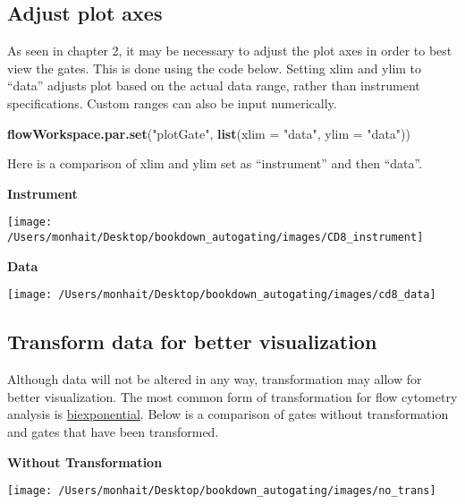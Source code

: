 \documentclass[]{book}
\newenvironment{Shaded}{\begin{snugshade}}{\end{snugshade}}
\newcommand{\DataTypeTok}[1]{\textcolor[rgb]{0.13,0.29,0.53}{#1}}
\newcommand{\KeywordTok}[1]{\textcolor[rgb]{0.13,0.29,0.53}{\textbf{#1}}}
\newcommand{\NormalTok}[1]{#1}
\newcommand{\StringTok}[1]{\textcolor[rgb]{0.31,0.60,0.02}{#1}}
\begin{document}
\hypertarget{adjust-plot-axes}{%
\subsection{Adjust plot axes}\label{adjust-plot-axes}}

As seen in chapter 2, it may be necessary to adjust the plot axes in order to best view the gates. This is done using the code below. Setting xlim and ylim to ``data'' adjusts plot based on the actual data range, rather than instrument specifications. Custom ranges can also be input numerically.

\begin{Shaded}
\begin{Highlighting}[]
\KeywordTok{flowWorkspace.par.set}\NormalTok{(}\StringTok{"plotGate"}\NormalTok{, }\KeywordTok{list}\NormalTok{(}\DataTypeTok{xlim =} \StringTok{"data"}\NormalTok{,}
                                       \DataTypeTok{ylim =} \StringTok{"data"}\NormalTok{))}
\end{Highlighting}
\end{Shaded}

Here is a comparison of xlim and ylim set as ``instrument'' and then ``data''.

\textbf{Instrument}

\texttt{[image: /Users/monhait/Desktop/bookdown\_autogating/images/CD8\_instrument]}

\textbf{Data}

\texttt{[image: /Users/monhait/Desktop/bookdown\_autogating/images/cd8\_data]}

\hypertarget{transform-data-for-better-visualization}{%
\subsection{Transform data for better visualization}\label{transform-data-for-better-visualization}}

Although data will not be altered in any way, transformation may allow for better visualization. The most common form of transformation for flow cytometry analysis is \href{http://docs.flowjo.com/vx/graphs-and-gating/gw-transform-overview/}{biexponential}. Below is a comparison of gates without transformation and gates that have been transformed.

\textbf{Without Transformation}

\texttt{[image: /Users/monhait/Desktop/bookdown\_autogating/images/no\_trans]}
\end{document}
